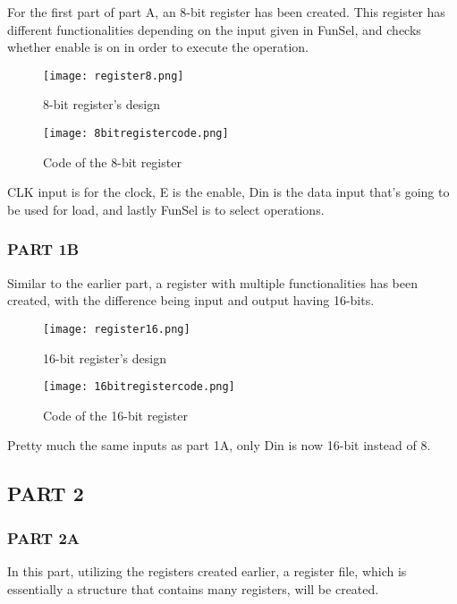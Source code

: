 \documentclass[pdftex,12pt,a4paper]{article}
\begin{document}
For the first part of part A, an 8-bit register has been created. This register has different functionalities depending on the input given in FunSel, and checks whether enable is on in order to execute the operation. 

\begin{itemize}

\begin{figure}[H]
	\centering
	\texttt{[image: register8.png]}	
	\caption{8-bit register's design}
	\label{fig1-1}
\end{figure}

\begin{figure}[H]
	\centering
	\texttt{[image: 8bitregistercode.png]}	
	\caption{Code of the 8-bit register}
	\label{fig1-1}
\end{figure}
\singlespacing

CLK input is for the clock, E is the enable, Din is the data input that's going to be used for load, and lastly FunSel is to select operations.

\pagebreak

\subsubsection{PART 1B}

Similar to the earlier part, a register with multiple functionalities has been created, with the difference being input and output having 16-bits.
\begin{figure}[H]
	\centering
	\texttt{[image: register16.png]}	
	\caption{16-bit register's design}
	\label{fig1-1}
\end{figure}

\begin{figure}[H]
	\centering
	\texttt{[image: 16bitregistercode.png]}	
	\caption{Code of the 16-bit register}
	\label{fig1-1}
\end{figure}
\singlespacing

Pretty much the same inputs as part 1A, only Din is now 16-bit instead of 8.
\subsection{PART 2}

\subsubsection{PART 2A}
In this part, utilizing the registers created earlier, a register file, which is essentially a structure that contains many registers, will be created.


\end{itemize}
\end{document}
